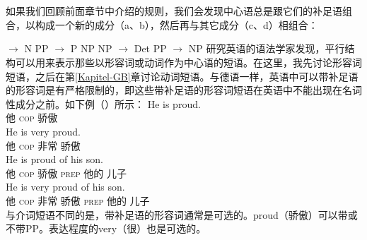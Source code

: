 \section{\xbartc}
\label{sec-xbar}

如果我们回顾前面章节中介绍的规则，我们会发现中心语总是跟它们的补足语组合，以构成一个新的成分（a、b），然后再与其它成分（c、d）相组合：

\eal
\ex \nbar $\to$ N PP
\ex \pbar $\to$ P NP
\ex\label{Regel-NP-Xbar}
    NP $\to$ Det \nbar
\ex PP $\to$ NP \pbar
\zl
%
研究英语的语法学家发现，平行结构可以用来表示那些以形容词或动词作为中心语的短语。在这里，我先讨论形容词短语，之后在第\ref{Kapitel-GB}章讨论动词短语。与德语一样，英语中可以带补足语的形容词是有严格限制的，即这些带补足语的形容词短语在英语中不能出现在名词性成分之前。如下例（）所示：
\eal
\ex 
\gll He is proud.\\
     他 \textsc{cop} 骄傲\\
\ex 
\gll He is very proud.\\
他 \textsc{cop} 非常 骄傲\\
\ex 
\gll He is proud of his son.\\
他 \textsc{cop} 骄傲 \textsc{prep} 他的 儿子\\
\ex 
\gll He is very proud of his son.\\
他 \textsc{cop} 非常 骄傲 \textsc{prep} 他的 儿子\\
\zl
与介词短语不同的是，带补足语的形容词通常是可选的。proud（骄傲）可以带或不带PP。表达程度的very（很）也是可选的。

